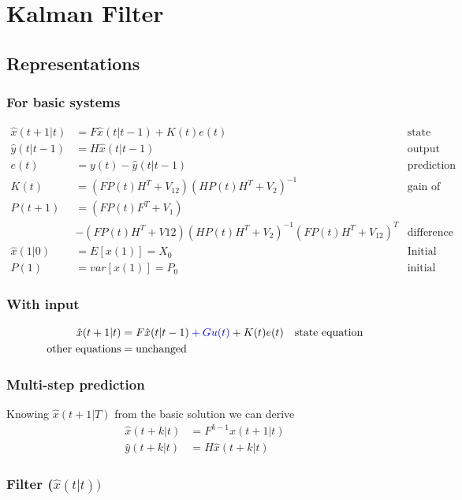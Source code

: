 \documentclass{report}
\begin{document}
\chapter{Kalman Filter}
\section{Representations}
\subsection{For basic systems}
\begin{align*}
\hat{x}(t+1|t)&=F\hat{x}(t|t-1)+K(t)e(t)&\text{state equation}\\
\hat{y}(t|t-1)&=H\hat{x}(t|t-1)&\text{output equation}\\
e(t)&=y(t)-\hat{y}(t|t-1)&\text{prediction error}\\
K(t)&=\left(FP(t)H^T+V_{12}\right)\left(HP(t)H^T+V_2\right)^{-1}&\text{gain of the KF}\\
P(t+1)&=\left(FP(t)F^T+V_1\right)\\
&-\left(FP(t)H^T+V{12}\right)\left(HP(t)H^T+V_2\right)^{-1}\left(FP(t)H^T+V_{12}\right)^T&\text{difference Riccati equation}\\
\hline
\hat{x}(1|0)&=E\left[x(1)\right]=X_0&\text{Initial state}\\
P(1)&=var\left[x(1)\right]=P_0&\text{initial DRE}
\end{align*}
\subsection{With input}
\begin{align*}
\hat{x}(t+1|t)&=F\hat{x}(t|t-1)\color{blue}+Gu(t)\color{black}+K(t)e(t)&\text{state equation}\\
\text{other equations}&=\text{unchanged}
\end{align*}
\subsection{Multi-step prediction}
Knowing $\hat{x}(t+1|T)$ from the basic solution we can derive
\begin{align*}
\hat{x}(t+k|t)&=F^{k-1}\hat{x}(t+1|t)\\
\hat{y}(t+k|t)&=H\hat{x}(t+k|t)
\end{align*}
\subsection{Filter ($\hat{x}(t|t))$}
\end{document}
